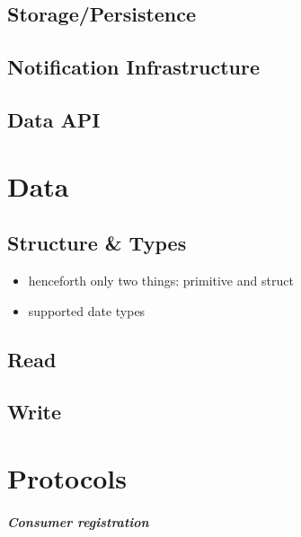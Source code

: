 \documentclass[12pt,english,a4paper,titlepage,cleardoublepage=empty,dottedtoc]{report}
\providecommand{\tightlist}{%
  \setlength{\itemsep}{0pt}\setlength{\parskip}{0pt}}
\begin{document}
\subsection{Storage/Persistence}\label{storagepersistence}

\subsection{Notification
Infrastructure}\label{notification-infrastructure-1}

\subsection{Data API}\label{data-api}

\section{Data}\label{data-1}

\subsection{Structure \& Types}\label{structure-types}

\begin{itemize}
\tightlist
\item
  henceforth only two things: primitive and struct
\item
  supported date types
\end{itemize}

\subsection{Read}\label{read}

\subsection{Write}\label{write}

\section{Protocols}\label{protocols}

\subparagraph{Consumer registration}\label{consumer-registration}
\end{document}
